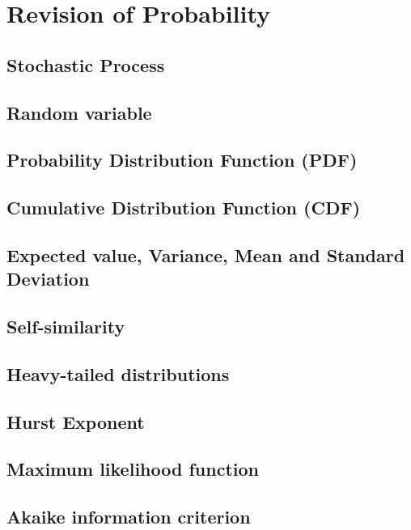 \chapter{Revision of Probability}
\label{ap:revision-probability}

\section{Stochastic Process}

\section{Random variable}

\section{Probability Distribution Function (PDF)}

\section{Cumulative Distribution Function (CDF)}

\section{Expected value, Variance, Mean and Standard Deviation}

\section{Self-similarity}

\section{Heavy-tailed distributions}

\section{Hurst Exponent}

\section{Maximum likelihood function}

\section{Akaike information criterion}

